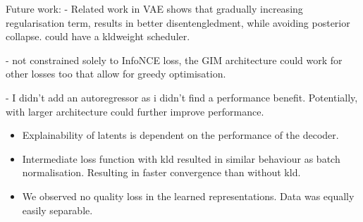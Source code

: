 \documentclass[]{book}
\begin{document}
Future work:
 - Related work in VAE shows that gradually increasing regularisation term, results in better disentengledment, while avoiding posterior collapse. could have a kldweight scheduler.
 
- not constrained solely to InfoNCE loss, the GIM architecture could work for other losses too that allow for greedy optimisation.


- I didn't add an autoregressor as i didn't find a performance benefit. Potentially, with larger architecture could further improve performance.



\begin{itemize}
	\item Explainability of latents is dependent on the performance of the decoder.
	\item Intermediate loss function with kld resulted in similar behaviour as batch normalisation. Resulting in faster convergence than without kld.
	\item We observed no quality loss in the learned representations. Data was equally easily separable.
\end{itemize}








\end{document}
